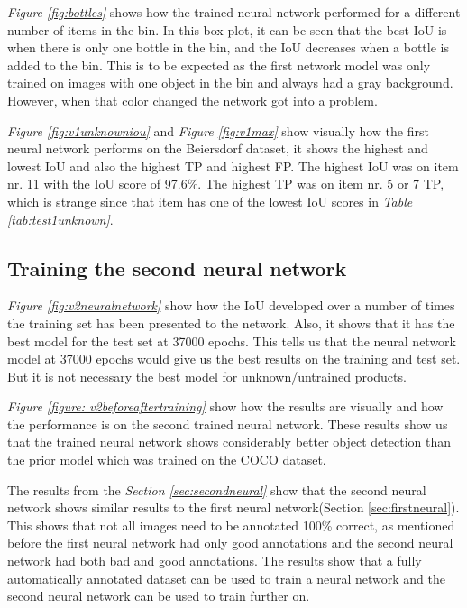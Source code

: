 \textit{Figure \ref{fig:bottles}} shows how the trained neural network performed for a different number of items in the bin. In this box plot, it can be seen that the best IoU is when there is only one bottle in the bin, and the IoU decreases when a bottle is added to the bin. This is to be expected as the first network model was only trained on images with one object in the bin and always had a gray background. However, when that color changed the network got into a problem.

\textit{Figure \ref{fig:v1unknowniou}} and \textit{Figure \ref{fig:v1max}} show visually how the first neural network performs on the Beiersdorf dataset, it shows the highest and lowest IoU and also the highest TP and highest FP. The highest IoU was on item nr. 11 with the IoU score of 97.6\%. The highest TP was on item nr. 5 or 7 TP, which is strange since that item has one of the lowest IoU scores in \textit{Table \ref{tab:test1unknown}}.

\subsection{Training the second neural network}
\textit{Figure \ref{fig:v2neuralnetwork}} show how the IoU developed over a number of times the training set has been presented to the network. Also, it shows that it has the best model for the test set at 37000 epochs. This tells us that the neural network model at 37000 epochs would give us the best results on the training and test set. But it is not necessary the best model for unknown/untrained products.

\textit{Figure \ref{figure: v2beforeaftertraining}} show how the results are visually and how the performance is on the second trained neural network. These results show us that the trained neural network shows considerably better object detection than the prior model which was trained on the COCO dataset. 

The results from the \textit{Section \ref{sec:secondneural}} show that the second neural network shows similar results to the first neural network({Section \ref{sec:firstneural}}). This shows that not all images need to be annotated 100\% correct, as mentioned before the first neural network had only good annotations and the second neural network had both bad and good annotations. The results show that a fully automatically annotated dataset can be used to train a neural network and the second neural network can be used to train further on.


